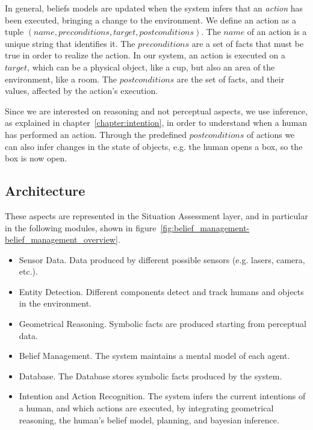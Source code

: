 In general, beliefs models are updated when the system infers that an \textit{action} has been executed, bringing a change to the environment.  We define an action as a tuple $(name, preconditions, target, postconditions)$. The $name$ of an action is a unique string that identifies it. The $preconditions$ are a set of facts that must be true in order to realize the action. In our system, an action is executed on a $target$, which can be a physical object, like a cup, but also an area of the environment, like a room. The $postconditions$ are the set of facts, and their values, affected by the action's execution.  


Since we are interested on reasoning and not perceptual aspects, we use inference, as explained in chapter~\ref{chapter:intention}, in order to understand when a human has performed an action. Through the predefined $postconditions$ of actions we can also infer changes in the state of objects, e.g. the human opens a box, so the box is now open. 


\subsection{Architecture}
These aspects are represented in the Situation Assessment layer, and in particular in the following modules, shown in figure~\ref{fig:belief_management-belief_management_overview}.

\begin{itemize}
\item Sensor Data. Data produced by different possible sensors (e.g. lasers, camera, etc.).
\item Entity Detection. Different components detect and track humans and objects in the environment.
\item Geometrical Reasoning. Symbolic facts are produced starting from perceptual data.
\item Belief Management. The system maintains a mental model of each agent.
\item Database. The Database stores symbolic facts produced by the system.
\item Intention and Action Recognition. The system infers the current intentions of a human, and which actions are executed, by integrating  geometrical reasoning, the human's belief model, planning, and bayesian inference.
\end{itemize}

